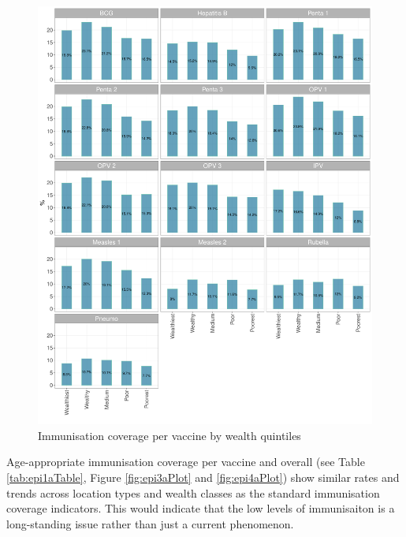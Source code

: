 \documentclass[12pt,a4paper]{article}
\begin{document}
\begin{figure}[H]

{\centering \includegraphics{kayinReport_files/figure-latex/epi4plot-1} 

}

\caption{Immunisation coverage per vaccine by wealth quintiles}\label{fig:epi4plot}
\end{figure}

Age-appropriate immunisation coverage per vaccine and overall (see Table \ref{tab:epi1aTable}, Figure \ref{fig:epi3aPlot} and \ref{fig:epi4aPlot}) show similar rates and trends across location types and wealth classes as the standard immunisation coverage indicators. This would indicate that the low levels of immunisaiton is a long-standing issue rather than just a current phenomenon.
\end{document}
